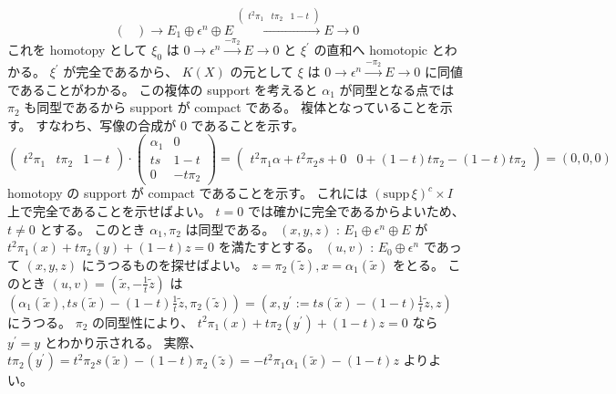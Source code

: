 \documentclass[dvipdfmx]{jsarticle}
\begin{document}
\begin{Proof}
\[{\begin{pmatrix}
    \end{pmatrix}
  }{\to} E_1 \oplus \epsilon^n \oplus E \overset{
    \begin{pmatrix}
      t^2 \pi_1 & t \pi_2 & 1 - t
    \end{pmatrix}
  }{\to} E \to 0\]
  これを homotopy として \(\xi_0\) は \(0 \to \epsilon^n \overset{-\pi_2}{\to} E \to 0\) と \(\xi ^\prime\) の直和へ homotopic とわかる。
  \(\xi^\prime\) が完全であるから、 \(K(X)\) の元として \(\xi\) は \(0 \to \epsilon^n \overset{-\pi_2}{\to} E \to 0\) に同値であることがわかる。
  この複体の support を考えると \(\alpha_1\) が同型となる点では \(\pi_2\) も同型であるから support が compact である。
\itemthen
  複体となっていることを示す。
  すなわち、写像の合成が \(0\) であることを示す。
  \[
    \begin{pmatrix}
      t^2 \pi_1 & t \pi_2 & 1 - t
    \end{pmatrix} \cdot \begin{pmatrix}
      \alpha_1 & 0\\
      t s & 1 - t \\
      0 & - t \pi_2
    \end{pmatrix} =
    \begin{pmatrix}
      t^2 \pi_1 \alpha + t^2 \pi_2 s + 0 & 0 + (1-t) t \pi_2 - (1-t) t \pi_2
    \end{pmatrix} = (0,0,0)
  \]
\itemthen
  homotopy の support が compact であることを示す。
  これには \((\text{supp} \, \xi)^c \times I\) 上で完全であることを示せばよい。
  \(t=0\) では確かに完全であるからよいため、 \(t \not = 0\) とする。
  このとき \(\alpha_1 , \pi_2\) は同型である。
  \((x,y,z)\) : \(E_1 \oplus \epsilon^n \oplus E\) が \(t^2 \pi_1(x) + t \pi_2(y) + (1-t) z = 0\) を満たすとする。
  \((u,v)\) : \(E_0 \oplus \epsilon^n\) であって \((x,y,z)\) にうつるものを探せばよい。
  \(z = \pi_2(\tilde{z}) , x = \alpha_1(\tilde{x})\) をとる。
  このとき \((u,v) = (\tilde{x} , - \frac{1}{t} \tilde{z})\) は \((\alpha_1(\tilde{x}) , t s(\tilde{x}) - (1-t) \frac{1}{t} \tilde{z} , \pi_2(\tilde{z})) = (x , y^\prime := t s(\tilde{x}) - (1-t) \frac{1}{t} \tilde{z} , z)\) にうつる。
  \(\pi_2\) の同型性により、 \(t^2 \pi_1(x) + t \pi_2(y^\prime) + (1-t) z = 0\) なら \(y^\prime = y\) とわかり示される。
  実際、 \(t \pi_2(y^\prime) = t^2 \pi_2 s(\tilde{x}) - (1-t) \pi_2(\tilde{z}) = - t^2 \pi_1 \alpha_1 (\tilde{x}) - (1-t) z\) よりよい。
\end{Proof}
\end{document}
